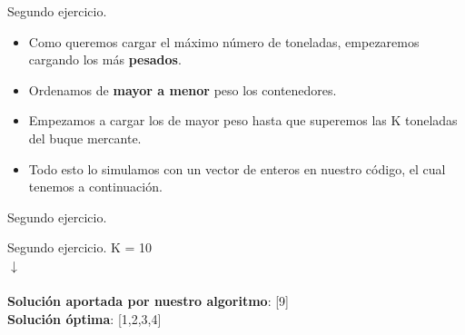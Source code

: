 \documentclass[10pt, xcolor=table]{beamer}
\begin{document}
\begin{frame}[fragile]{Segundo ejercicio. }
	\begin{itemize}
		\item Como queremos cargar el máximo número de toneladas, empezaremos cargando los más \textbf{pesados}.
		\item Ordenamos de \textbf{mayor a menor} peso los contenedores.
		\item Empezamos a cargar los de mayor peso hasta que superemos las K toneladas del buque mercante.
		\item Todo esto lo simulamos con un vector de enteros en nuestro código, el cual tenemos a continuación.
	\end{itemize}
\end{frame}

\begin{frame}[fragile]{Segundo ejercicio. }
	
\end{frame}

\begin{frame}[fragile]{Segundo ejercicio. }
	\centering [5, 4, 6, 1, 1, 2, 7, 9, 8, 3] \hspace{0.2cm}K = 10
	\\
	\centering $\downarrow$
	\\
	\centering [9, 8, 7, 6, 5, 4, 3, 2, 1, 1]
	\\
	\textbf{Solución aportada por nuestro algoritmo}: [9]
	\\
	\textbf{Solución óptima}: [1,2,3,4]
	
\end{frame}
\end{document}
